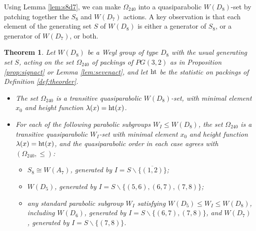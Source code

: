 \documentclass{amsart}
\theoremstyle{plain}
\newtheorem{theorem}{Theorem}[section]
\theoremstyle{definition}
\theoremstyle{remark}
\numberwithin{equation}{section}
\newcommand{\rootht}{\text{\rm ht}}
\newcommand{\qpx}{\Omega_{240}}
\begin{document}
Using Lemma \ref{lem:s8d7}, we can make $\qpx$ into a quasiparabolic $W(D_8)$-set by patching together the 
$S_8$ and $W(D_7)$ actions. A key observation is that each element of the generating set $S$ of $W(D_8)$ is
either a generator of $S_8$, or a generator of $W(D_7)$, or both.

\begin{theorem}\label{thm:qppack}
Let $W(D_8)$ be a Weyl group of type $D_8$ with the usual generating set $S$, acting on the set $\qpx$ of packings
of $PG(3, 2)$ as in Proposition \ref{prop:signact} or Lemma \ref{lem:sevenact}, and let $\rootht$ be the
statistic on packings of Definition \ref{def:theorder}.
\begin{itemize}
\item[{\rm (i)}]{The set $\qpx$ is a transitive quasiparabolic $W(D_8)$-set, with minimal element $x_0$ and height 
function $\lambda(x) = \rootht(x)$.}
\item[{\rm (ii)}]{For each of the following parabolic subgroups $W_I \leq W(D_8)$, the set $\qpx$ is a transitive 
quasiparabolic $W_I$-set with minimal element $x_0$ and height function $\lambda(x) = \rootht(x)$, and the 
quasiparabolic order in each case agrees with $(\qpx, \leq)$:
\begin{itemize}
\item[{\rm (a)}]{$S_8 \cong W(A_7)$, generated by $I = S \backslash \{\overline{(1, 2)}\}$;}
\item[{\rm (b)}]{$W(D_5)$, generated by $I = S \backslash \{(5, 6), (6, 7), (7, 8)\}$;}
\item[{\rm (c)}]{any standard parabolic subgroup $W_I$ satisfying $W(D_5) \leq W_I \leq W(D_8)$, including $W(D_6)$,
generated by $I = S \backslash \{(6, 7), (7, 8)\}$, and $W(D_7)$, generated by $I = S \backslash \{(7, 8)\}$.}
\end{itemize}}
\end{itemize}
\end{theorem}
\end{document}
